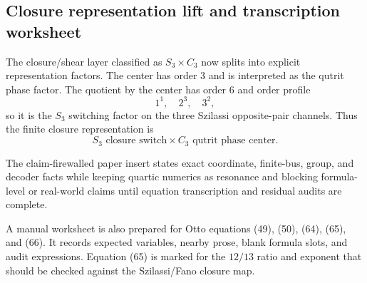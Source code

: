 \subsection{Closure representation lift and transcription worksheet}
\label{sec:bt1456-bt1458-representation-worksheet}

The closure/shear layer classified as \(S_3\times C_3\) now splits into explicit
representation factors.  The center has order 3 and is interpreted as the
qutrit phase factor.  The quotient by the center has order 6 and order profile
\[
1^1,\quad2^3,\quad3^2,
\]
so it is the \(S_3\) switching factor on the three Szilassi opposite-pair
channels.  Thus the finite closure representation is
\[
S_3\text{ closure switch}\times C_3\text{ qutrit phase center}.
\]

The claim-firewalled paper insert states exact coordinate, finite-bus, group,
and decoder facts while keeping quartic numerics as resonance and blocking
formula-level or real-world claims until equation transcription and residual
audits are complete.

A manual worksheet is also prepared for Otto equations (49), (50), (64), (65),
and (66).  It records expected variables, nearby prose, blank formula slots, and
audit expressions.  Equation (65) is marked for the \(12/13\) ratio and exponent
that should be checked against the Szilassi/Fano closure map.
